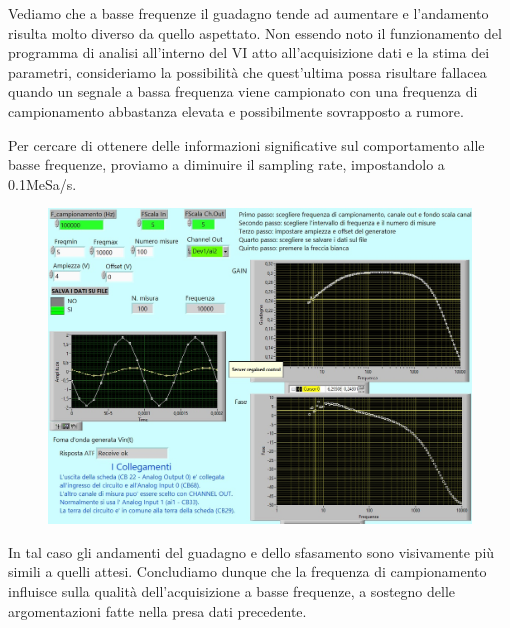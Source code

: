 Vediamo che a basse frequenze il guadagno tende ad aumentare e l'andamento risulta molto diverso da quello aspettato. Non essendo noto il funzionamento del programma di analisi all'interno del VI atto all'acquisizione dati e la stima dei parametri, consideriamo la possibilità che quest'ultima possa risultare fallacea quando un segnale a bassa frequenza viene campionato con una frequenza di campionamento abbastanza elevata e possibilmente sovrapposto a rumore.

Per cercare di ottenere delle informazioni significative sul comportamento alle basse frequenze, proviamo a diminuire il sampling rate, impostandolo a 0.1MeSa/s.

\begin{figure}[H]
\caption{}
    \includegraphics[width=12cm]{settimana_2/immagini/CRRC_2_nuovo.jpg}
    \centering
\end{figure}

In tal caso gli andamenti del guadagno e dello sfasamento sono visivamente più simili a quelli attesi. Concludiamo dunque che la frequenza di campionamento influisce sulla qualità dell'acquisizione a basse frequenze, a sostegno delle argomentazioni fatte nella presa dati precedente.


